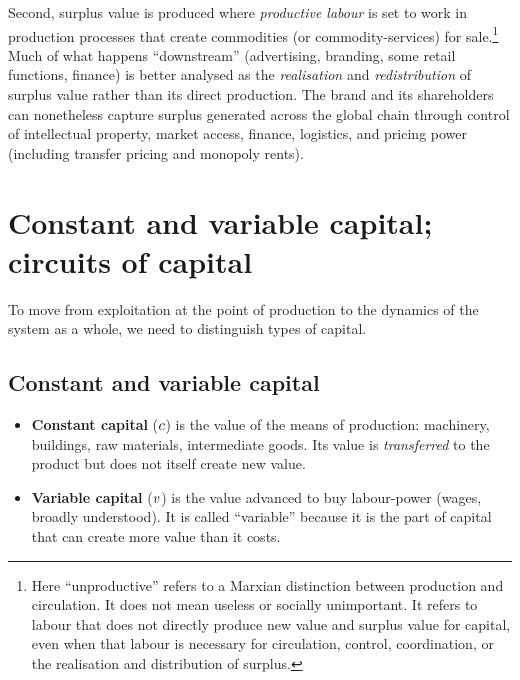 Second, surplus value is produced where \emph{productive labour} is set to work in production
processes that create commodities (or commodity-services) for sale.\footnote{Here ``unproductive'' refers to a Marxian distinction between production and circulation. It does not mean useless or socially unimportant. It refers to labour that does not directly produce new value and surplus value for capital, even when that labour is necessary for circulation, control, coordination, or the realisation and distribution of surplus.}
Much of what happens
``downstream'' (advertising, branding, some retail functions, finance) is better analysed as
the \emph{realisation} and \emph{redistribution} of surplus value rather than its direct
production. The brand and its shareholders can nonetheless capture surplus generated across
the global chain through control of intellectual property, market access, finance, logistics,
and pricing power (including transfer pricing and monopoly rents).\cite{Smith2016,Hickel2022}


\section{Constant and variable capital; circuits of capital}
\label{sec:constant-variable}

To move from exploitation at the point of production to the dynamics of the
system as a whole, we need to distinguish types of capital.\cite{Marx1867}

\subsection{Constant and variable capital}

\begin{itemize}[leftmargin=1.5em]
  \item \textbf{Constant capital} ($c$) is the value of the means of
  production: machinery, buildings, raw materials, intermediate goods.
  Its value is \emph{transferred} to the product but does not itself create
  new value.
  \item \textbf{Variable capital} ($v$) is the value advanced to buy
  labour-power (wages, broadly understood). It is called ``variable'' because
  it is the part of capital that can create more value than it costs.
\end{itemize}

